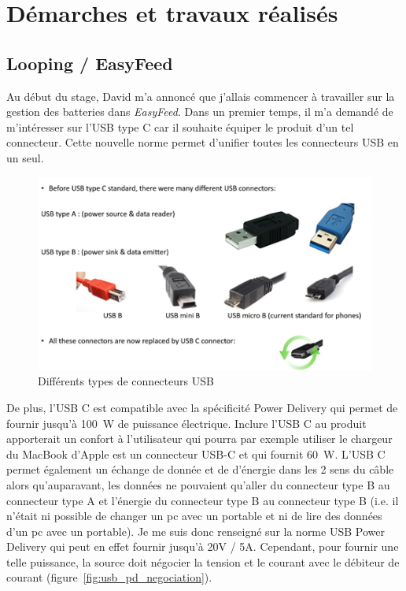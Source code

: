 \documentclass[a4paper, 12pt, sffamily]{report}
\begin{document}
\chapter{Démarches et travaux réalisés}
\section{Looping / EasyFeed}
Au début du stage, David m’a annoncé que j'allais commencer à travailler sur la gestion des batteries dans \emph{EasyFeed}. Dans un premier temps, il m'a demandé de m’intéresser sur l’USB type C car il souhaite équiper le produit d’un tel connecteur. Cette nouvelle norme permet d’unifier toutes les connecteurs USB en un seul.

\begin{figure}[H]
\centering
\includegraphics[scale=0.75]{figures/screenshots/different_usb_types.png}
\caption{Différents types de connecteurs USB}
\label{fig:usb_type}
\end{figure}

De plus, l’USB C est compatible avec la spécificité Power Delivery qui permet de fournir jusqu’à \SI{100}{\watt} de puissance électrique. Inclure l’USB C au produit apporterait un confort à l’utilisateur qui pourra par exemple utiliser le chargeur du MacBook d’Apple est un connecteur USB-C et qui fournit \SI{60}{\watt}.
L'USB C permet également un échange de donnée et de d'énergie dans les 2 sens du câble alors qu'auparavant, les données ne pouvaient qu'aller du connecteur type B au connecteur type A et l'énergie du connecteur type B au connecteur type B (i.e. il n'était ni possible de changer un pc avec un portable et ni de lire des données d'un pc avec un portable).
Je me suis donc renseigné sur la norme USB Power Delivery qui peut en effet fournir jusqu’à 20V / 5A. Cependant, pour fournir une telle puissance, la source doit négocier la tension et le courant avec le débiteur de courant (figure~\ref{fig:usb_pd_negociation}).
\end{document}
